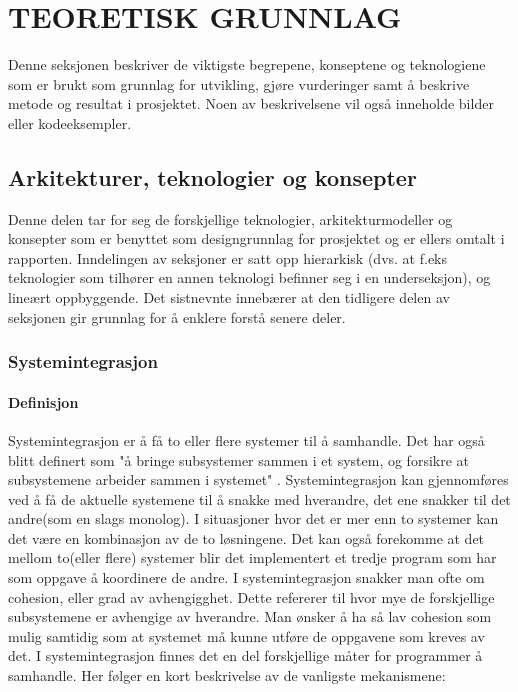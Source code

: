 \documentclass[../main.tex]{subfiles}
\begin{document}
\chapter{TEORETISK GRUNNLAG}

Denne seksjonen beskriver de viktigste begrepene, konseptene og teknologiene som er brukt som grunnlag for utvikling, gjøre vurderinger samt å beskrive metode og resultat i prosjektet. Noen av beskrivelsene vil også inneholde bilder eller kodeeksempler.

\section{Arkitekturer, teknologier og konsepter}

Denne delen tar for seg de forskjellige teknologier, arkitekturmodeller og konsepter som er benyttet som designgrunnlag for prosjektet og er ellers omtalt i rapporten. Inndelingen av seksjoner er satt opp hierarkisk (dvs. at f.eks teknologier som tilhører en annen teknologi befinner seg i en underseksjon), og lineært oppbyggende. Det sistnevnte innebærer at den tidligere delen av seksjonen gir grunnlag for å enklere forstå senere deler.

\subsection{Systemintegrasjon}

\subsubsection{Definisjon}
Systemintegrasjon er å få to eller flere systemer til å samhandle. Det har også blitt definert som "å bringe subsystemer sammen i et system, og forsikre at subsystemene arbeider sammen i systemet" . \newline
\newline
Systemintegrasjon kan gjennomføres ved å få de aktuelle systemene til å snakke med hverandre, det ene snakker til det andre(som en slags monolog). I situasjoner hvor det er mer enn to systemer kan det være en kombinasjon av de to løsningene. Det kan også forekomme at det mellom to(eller flere) systemer blir det implementert et tredje program som har som oppgave å koordinere de andre.\newline
\newline
I systemintegrasjon snakker man ofte om cohesion, eller grad av avhengigghet. Dette refererer til hvor mye de forskjellige subsystemene er avhengige av hverandre. Man ønsker å ha så lav cohesion som mulig samtidig som at systemet må kunne utføre de oppgavene som kreves av det. \newline
\newline
I systemintegrasjon finnes det en del forskjellige måter for programmer å samhandle. Her følger en kort beskrivelse av de vanligste mekanismene:
\end{document}
